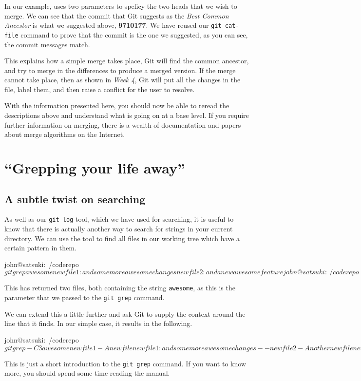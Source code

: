 In our example,  uses two parameters to speficy the two heads that we wish to merge.
We can see that the commit that Git suggests as the \emph{Best Common Ancestor} is what we suggested above, \textbf{9710177}.
We have reused our \texttt{git cat-file} command to prove that the commit is the one we suggested, as you can see, the commit messages match.

This explains how a simple merge takes place, Git will find the common ancestor, and try to merge in the differences to produce a merged version.
If the merge cannot take place, then as shown in \emph{Week 4}, Git will put all the changes in the file, label them, and then raise a conflict for the user to resolve.

With the information presented here, you should now be able to reread the descriptions above and understand what is going on at a base level.
If you require further information on merging, there is a wealth of documentation and papers about merge algorithms on the Internet.

\section{``Grepping your life away''}
\subsection{A subtle twist on searching}
As well as our \texttt{git log} tool, which we have used for searching, it is useful to know that there is actually another way to search for strings in your current directory.
We can use the  tool to find all files in our working tree which have a certain pattern in them.

\begin{code}
john@satsuki:~/coderepo$ git grep awesome
newfile1:and some more awesome changes
newfile2:and a new awesome feature
john@satsuki:~/coderepo$
\end{code}

This has returned two files, both containing the string \texttt{awesome}, as this is the parameter that we passed to the \texttt{git grep} command.

We can extend this a little further and ask Git to supply the context around the line that it finds.
In our simple case, it results in the following.

\begin{code}
john@satsuki:~/coderepo$ git grep -C3 awesome
newfile1-A new file
newfile1:and some more awesome changes
--
newfile2-Another new file
newfile2:and a new awesome feature
john@satsuki:~/coderepo$
\end{code}

This is just a short introduction to the \texttt{git grep} command.
If you want to know more, you should spend some time reading the manual.
